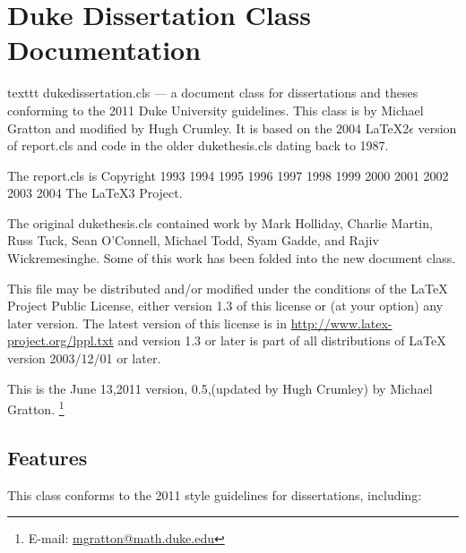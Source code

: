 \section{Duke Dissertation Class Documentation}\label{chap:guide}

texttt{ dukedissertation.cls } --- a document class for dissertations
and theses conforming to the 2011 Duke University guidelines. This class
is by Michael Gratton and modified by Hugh Crumley. It is based on the
2004 LaTeX2$\epsilon$ version of report.cls and code in the older
dukethesis.cls dating back to 1987.

The report.cls is Copyright 1993 1994 1995 1996 1997 1998 1999 2000 2001
2002 2003 2004 The LaTeX3 Project.

The original dukethesis.cls contained work by Mark Holliday, Charlie
Martin, Russ Tuck, Sean O'Connell, Michael Todd, Syam Gadde, and Rajiv
Wickremesinghe. Some of this work has been folded into the new document
class.

This file may be distributed and/or modified under the conditions of the
LaTeX Project Public License, either version 1.3 of this license or (at
your option) any later version. The latest version of this license is in
\url{http://www.latex-project.org/lppl.txt} and version 1.3 or later is
part of all distributions of LaTeX version 2003/12/01 or later.

This is the June 13,2011 version, 0.5,(updated by Hugh Crumley) by
Michael Gratton. \footnote{E-mail:
  \href{mailto:mgratton@math.duke.edu}{mgratton@math.duke.edu}}

\subsection{Features}\label{features}

This class conforms to the 2011 style guidelines for dissertations,
including:

